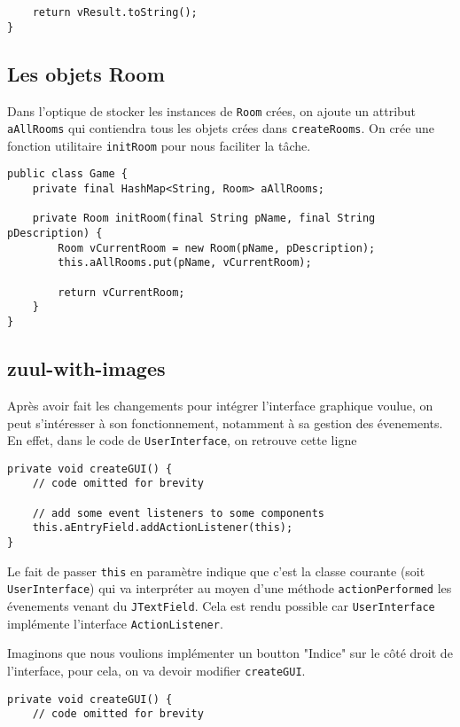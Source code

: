 \begin{exercise}[subtitle=getCommandList]
\begin{verbatim}
    return vResult.toString();
}
\end{verbatim}

\subsection*{Les objets Room}

Dans l'optique de stocker les instances de \verb|Room| crées, on ajoute un attribut \verb|aAllRooms| qui contiendra tous les objets crées dans \verb|createRooms|. On crée une fonction utilitaire \verb|initRoom| pour nous faciliter la tâche.

\begin{verbatim}
public class Game {
    private final HashMap<String, Room> aAllRooms;

    private Room initRoom(final String pName, final String pDescription) {
        Room vCurrentRoom = new Room(pName, pDescription);
        this.aAllRooms.put(pName, vCurrentRoom);

        return vCurrentRoom;
    }
}
\end{verbatim}

\subsection*{zuul-with-images}

Après avoir fait les changements pour intégrer l'interface graphique voulue, on peut s'intéresser à son fonctionnement, notamment à sa gestion des évenements. En effet, dans le code de \verb|UserInterface|, on retrouve cette ligne

\begin{verbatim}
private void createGUI() {
    // code omitted for brevity
    
    // add some event listeners to some components
    this.aEntryField.addActionListener(this);
}
\end{verbatim}

Le fait de passer \verb|this| en paramètre indique que c'est la classe courante (soit \verb|UserInterface|) qui va interpréter au moyen d'une méthode \verb|actionPerformed| les évenements venant du \verb|JTextField|. Cela est rendu possible car \verb|UserInterface| implémente l'interface \verb|ActionListener|.

Imaginons que nous voulions implémenter un boutton "Indice" sur le côté droit de l'interface, pour cela, on va devoir modifier \verb|createGUI|.

\begin{verbatim}
private void createGUI() {
    // code omitted for brevity
    

\end{verbatim}
\end{exercise}
